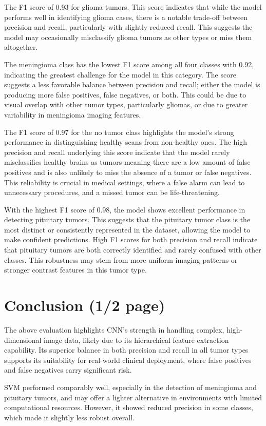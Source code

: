 \documentclass[conference]{IEEEtran}
\begin{document}
The F1 score of 0.93 for glioma tumors. This score indicates that while the model performs well in identifying glioma cases, there is a notable trade-off between precision and recall, particularly with slightly reduced recall. This suggests the model may occasionally misclassify glioma tumors as other types or miss them altogether.

The meningioma class has the lowest F1 score among all four classes with 0.92, indicating the greatest challenge for the model in this category. The score suggests a less favorable balance between precision and recall; either the model is producing more false positives, false negatives, or both. This could be due to visual overlap with other tumor types, particularly gliomas, or due to greater variability in meningioma imaging features. 

The F1 score of 0.97 for the no tumor class highlights the model’s strong performance in distinguishing healthy scans from non-healthy ones. The high precision and recall underlying this score indicate that the model rarely misclassifies healthy brains as tumors meaning there are a low amount of false positives and is also unlikely to miss the absence of a tumor or false negatives. This reliability is crucial in medical settings, where a false alarm can lead to unnecessary procedures, and a missed tumor can be life-threatening.

With the highest F1 score of 0.98, the model shows excellent performance in detecting pituitary tumors. This suggests that the pituitary tumor class is the most distinct or consistently represented in the dataset, allowing the model to make confident predictions. High F1 scores for both precision and recall indicate that pituitary tumors are both correctly identified and rarely confused with other classes. This robustness may stem from more uniform imaging patterns or stronger contrast features in this tumor type.

\section{\large Conclusion (1/2 page)}
The above evaluation highlights CNN's strength in handling complex, high-dimensional image data, likely due to its hierarchical feature extraction capability. Its superior balance in both precision and recall in all tumor types supports its suitability for real-world clinical deployment, where false positives and false negatives carry significant risk.

SVM performed comparably well, especially in the detection of meningioma and pituitary tumors, and may offer a lighter alternative in environments with limited computational resources. However, it showed reduced precision in some classes, which made it slightly less robust overall.
\end{document}
